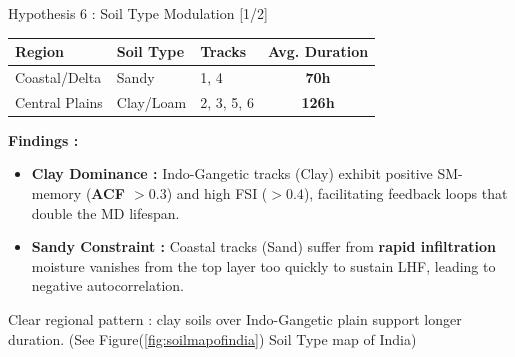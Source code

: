 \begin{frame}{Hypothesis 6 : Soil Type Modulation [1/2]}
	\vspace{0.15cm}
	\footnotesize
	\begin{center}
		\begin{tabular}{lllc}
			\toprule
			\textbf{Region} & \textbf{Soil Type} & \textbf{Tracks} & \textbf{Avg. Duration} \\
			\midrule
			Coastal/Delta   & Sandy              & 1, 4            & \textbf{70h}           \\
			Central Plains  & Clay/Loam          & 2, 3, 5, 6      & \textbf{126h}          \\
			\bottomrule
		\end{tabular}
	\end{center}

	\vspace{0.15cm}
	\footnotesize
	\textbf{Findings :}
	\begin{itemize} \tiny
		\item \textbf{Clay Dominance :} Indo-Gangetic tracks (Clay) exhibit positive SM-memory (\textbf{ACF $> 0.3$}) and high FSI (\textbf{$>0.4$}), facilitating feedback loops that double the MD lifespan.
		\item \textbf{Sandy Constraint :} Coastal tracks (Sand) suffer from \textbf{rapid infiltration} moisture vanishes from the top layer too quickly to sustain LHF, leading to negative autocorrelation.
	\end{itemize}

	Clear regional pattern : clay soils over Indo-Gangetic plain support longer duration. (See Figure(\ref{fig:soilmapofindia}) Soil Type map of India)
\end{frame}

